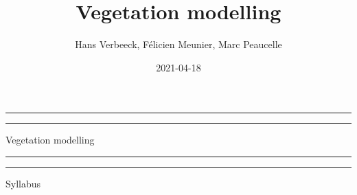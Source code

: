 \documentclass[
  12pt,
  oneside]{book}
\title{Vegetation modelling}
\author{Hans Verbeeck, Félicien Meunier, Marc Peaucelle}
\date{2021-04-18}
\begin{document}
\maketitle

\newcommand{\plogo}{\fbox{$\mathcal{PL}$}} %
\frontmatter


\begin{titlepage} %

	\centering %
	
	\scshape %
	
	\vspace*{\baselineskip} %
	
	
	\vspace{12\baselineskip}
	
	\rule{\textwidth}{1.6pt}\vspace*{-\baselineskip}\vspace*{2pt} %
	\rule{\textwidth}{0.4pt} %
	
	\vspace{0.75\baselineskip} %
	
	{\LARGE Vegetation modelling\\} %
	
	\vspace{0.75\baselineskip} %
	
	\rule{\textwidth}{0.4pt}\vspace*{-\baselineskip}\vspace{3.2pt} %
	\rule{\textwidth}{1.6pt} %
	
	\vspace{2\baselineskip} %
	
	
	Syllabus %
	
	\vspace*{3\baselineskip} %
	
	

\end{titlepage}
\end{document}
